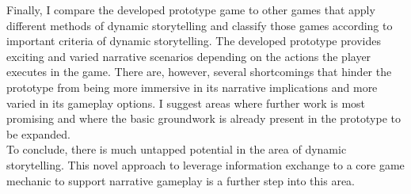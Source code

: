 Finally, I compare the developed prototype game to other games that apply different methods of dynamic storytelling and classify those games according to important criteria of dynamic storytelling. The developed prototype provides exciting and varied narrative scenarios depending on the actions the player executes in the game. There are, however, several shortcomings that hinder the prototype from being more immersive in its narrative implications and more varied in its gameplay options. I suggest areas where further work is most promising and where the basic groundwork is already present in the prototype to be expanded.\\
To conclude, there is much untapped potential in the area of dynamic storytelling. This novel approach to leverage information exchange to a core game mechanic to support narrative gameplay is a further step into this area.